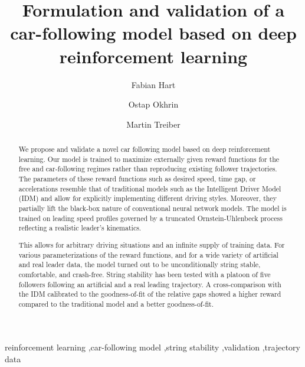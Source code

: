 \documentclass[review]{elsarticle}
\providecommand{\3}{{\ss}}
\begin{document}
	
	\begin{frontmatter}
		
		\title{Formulation and validation of a car-following model based on deep
			reinforcement learning}
		
		
		\author[firstAddress]{Fabian Hart}
		\author[firstAddress]{Ostap Okhrin}
		\author[firstAddress]{Martin Treiber}
		
		\address[firstAddress]{TU Dresden}
		
		
		
		
		\begin{abstract}		
			We propose and validate a novel car following model based on deep reinforcement learning. Our model is trained to maximize externally given reward functions for the free and car-following regimes rather than reproducing existing follower trajectories. The parameters of these reward functions such as desired speed, time gap, or accelerations resemble that of traditional models such as the Intelligent Driver Model (IDM) and allow for explicitly implementing different driving styles. Moreover, they partially lift the black-box nature of conventional neural network models. The model is trained on leading speed profiles governed by a truncated  Ornstein-Uhlenbeck process reflecting a realistic leader's kinematics.
			
			This allows for arbitrary driving situations and an infinite supply of training data. For various parameterizations of the reward functions, and for a wide variety of artificial and real leader data, the model turned out to be unconditionally string stable, comfortable, and crash-free. String stability has been tested with a platoon of five followers following an artificial and a real leading trajectory. A cross-comparison with the IDM  calibrated to the goodness-of-fit of the relative gaps showed a higher reward compared to the traditional model and a better goodness-of-fit.
		\end{abstract}
		
		
		\begin{keyword}
			reinforcement learning \sep car-following model \sep string stability \sep validation \sep trajectory data 
		\end{keyword}
		
	\end{frontmatter}
	
\end{document}
